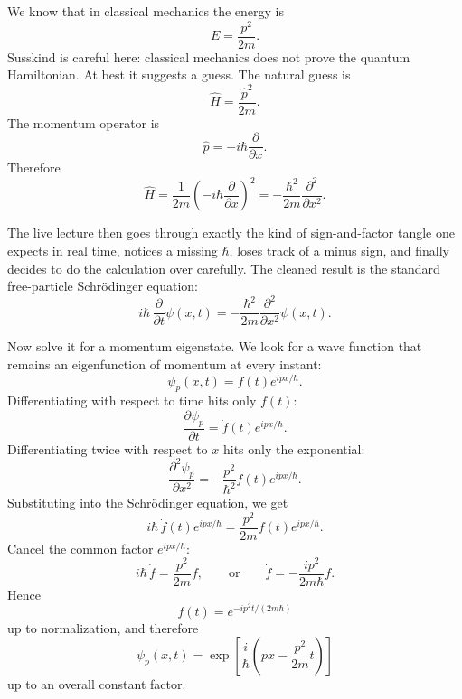We know that in classical mechanics the energy is
\begin{equation}
E=\frac{p^2}{2m}.
\end{equation}
Susskind is careful here: classical mechanics does not prove the quantum Hamiltonian. At best it suggests a guess. The natural guess is
\begin{equation}
\hat H=\frac{\hat p^2}{2m}.
\end{equation}
The momentum operator is
\begin{equation}
\hat p=-i\hbar\frac{\partial}{\partial x}.
\end{equation}
Therefore
\begin{equation}
\hat H
=
\frac{1}{2m}
\left(-i\hbar\frac{\partial}{\partial x}\right)^2
=
-\frac{\hbar^2}{2m}\frac{\partial^2}{\partial x^2}.
\end{equation}

The live lecture then goes through exactly the kind of sign-and-factor tangle one expects in real time, notices a missing $\hbar$, loses track of a minus sign, and finally decides to do the calculation over carefully. The cleaned result is the standard free-particle Schr\"odinger equation:
\begin{equation}
i\hbar\,\frac{\partial}{\partial t}\psi(x,t)
=
-\frac{\hbar^2}{2m}\frac{\partial^2}{\partial x^2}\psi(x,t).
\end{equation}

Now solve it for a momentum eigenstate. We look for a wave function that remains an eigenfunction of momentum at every instant:
\begin{equation}
\psi_p(x,t)=f(t)e^{ipx/\hbar}.
\end{equation}
Differentiating with respect to time hits only $f(t)$:
\begin{equation}
\frac{\partial\psi_p}{\partial t}
=
\dot f(t)e^{ipx/\hbar}.
\end{equation}
Differentiating twice with respect to $x$ hits only the exponential:
\begin{equation}
\frac{\partial^2\psi_p}{\partial x^2}
=
-\frac{p^2}{\hbar^2}f(t)e^{ipx/\hbar}.
\end{equation}
Substituting into the Schr\"odinger equation, we get
\begin{equation}
i\hbar\,\dot f(t)e^{ipx/\hbar}
=
\frac{p^2}{2m}f(t)e^{ipx/\hbar}.
\end{equation}
Cancel the common factor $e^{ipx/\hbar}$:
\begin{equation}
i\hbar\,\dot f=\frac{p^2}{2m}f,
\qquad\text{or}\qquad
\dot f=-\frac{i p^2}{2m\hbar}f.
\end{equation}
Hence
\begin{equation}
f(t)=e^{-ip^2 t/(2m\hbar)}
\end{equation}
up to normalization, and therefore
\begin{equation}
\psi_p(x,t)
=
\exp\!\left[\frac{i}{\hbar}\left(px-\frac{p^2}{2m}t\right)\right]
\end{equation}
up to an overall constant factor.

